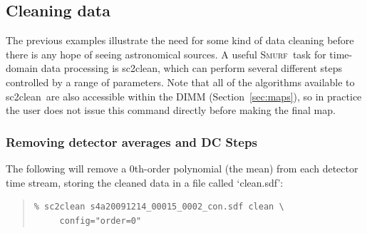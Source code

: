 \documentclass[twoside,11pt]{article}
\newenvironment{myquote}{\begin{quote}\begin{small}}{\end{small}\end{quote}}
\newcommand{\smurf}{\xref{\textsc{Smurf}}{sun258}{}}
\newcommand{\task}[1]{\textsf{#1}}
\newcommand{\clean}{\xref{\task{sc2clean}}{sun258}{SC2CLEAN}}
\newcommand{\xref}[3]{#1}
\newcommand{\xlabel}[1]{}
\renewcommand{\_}{\texttt{\symbol{95}}}
\begin{document}
\subsection{\xlabel{clean}Cleaning data}

The previous examples illustrate the need for some kind of data
cleaning before there is any hope of seeing astronomical sources. A
useful \smurf\ task for time-domain data processing is \clean, which
can perform several different steps controlled by a range of
parameters. Note that all of the algorithms available to \clean\ are
also accessible within the DIMM (Section~\ref{sec:maps}), so in
practice the user does not issue this command directly before making
the final map.

\subsubsection{\xlabel{clean_average}Removing detector averages and DC Steps}

The following will remove a 0th-order polynomial (the mean) from each
detector time stream, storing the cleaned data in a file called
`clean.sdf':

\begin{myquote}
\begin{verbatim}
% sc2clean s4a20091214_00015_0002_con.sdf clean \
     config="order=0"
\end{verbatim}
\end{myquote}
\end{document}
